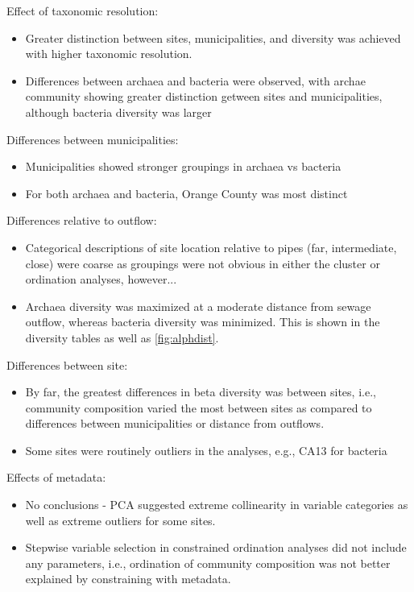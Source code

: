 \documentclass[letterpaper,12pt]{article}\usepackage[]{graphicx}\usepackage[]{color}
\begin{document}
Effect of taxonomic resolution:
\begin{itemize}
\item Greater distinction between sites, municipalities, and diversity was achieved with higher taxonomic resolution.
\item Differences between archaea and bacteria were observed, with archae community showing greater distinction getween sites and municipalities, although bacteria diversity was larger
\end{itemize}

Differences between municipalities:
\begin{itemize}
\item Municipalities showed stronger groupings in archaea vs bacteria
\item For both archaea and bacteria, Orange County was most distinct
\end{itemize}

Differences relative to outflow:
\begin{itemize}
\item Categorical descriptions of site location relative to pipes (far, intermediate, close) were coarse as groupings were not obvious in either the cluster or ordination analyses, however...
\item Archaea diversity was maximized at a moderate distance from sewage outflow, whereas bacteria diversity was minimized.  This is shown in the diversity tables as well as \cref{fig:alphdist}.
\end{itemize}

Differences between site:
\begin{itemize}
\item By far, the greatest differences in beta diversity was between sites, i.e., community composition varied the most between sites as compared to differences between municipalities or distance from outflows.  
\item Some sites were routinely outliers in the analyses, e.g., CA13 for bacteria
\end{itemize}

Effects of metadata:
\begin{itemize}
\item No conclusions - PCA suggested extreme collinearity in variable categories as well as extreme outliers for some sites.
\item Stepwise variable selection in constrained ordination analyses did not include any parameters, i.e., ordination of community composition was not better explained by constraining with metadata.
\end{itemize}
\end{document}
